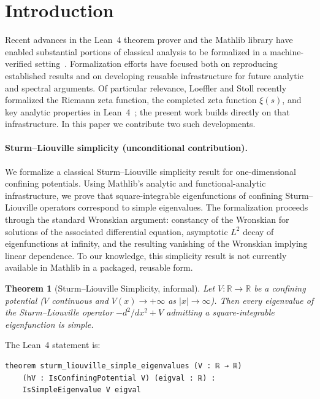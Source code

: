 \documentclass[12pt, a4paper]{article}
\theoremstyle{plain}
\newtheorem{theorem}{Theorem}[section]
\theoremstyle{definition}
\newcommand{\R}{\mathbb{R}}
\newcommand{\Mathlib}{\textsf{Mathlib}}
\newcommand{\Lean}{\textsf{Lean~4}}
\begin{document}
\tableofcontents
\bigskip

\section{Introduction}
\label{sec:intro}

Recent advances in the \Lean{} theorem prover and the \Mathlib{} library have
enabled substantial portions of classical analysis to be formalized in a
machine-verified setting~\cite{mathlib2020}.
Formalization efforts have focused both on reproducing established results and on
developing reusable infrastructure for future analytic and spectral arguments.
Of particular relevance, Loeffler and Stoll recently formalized the Riemann zeta
function, the completed zeta function $\xi(s)$, and key analytic properties in
\Lean{}~\cite{loeffler2025}; the present work builds directly on that infrastructure.
In this paper we contribute two such developments.

\paragraph{Sturm--Liouville simplicity (unconditional contribution).}
We formalize a classical Sturm--Liouville simplicity result for one-dimensional
confining potentials.
Using \Mathlib{}'s analytic and functional-analytic infrastructure, we prove that
square-integrable eigenfunctions of confining Sturm--Liouville operators correspond
to simple eigenvalues.
The formalization proceeds through the standard Wronskian argument: constancy of
the Wronskian for solutions of the associated differential equation, asymptotic
$L^2$ decay of eigenfunctions at infinity, and the resulting vanishing of the
Wronskian implying linear dependence.
To our knowledge, this simplicity result is not currently available in
\Mathlib{} in a packaged, reusable form.

\begin{theorem}[Sturm--Liouville Simplicity, informal]
\label{thm:sl_informal}
Let $V \colon \R \to \R$ be a confining potential
($V$ continuous and $V(x) \to +\infty$ as $|x| \to \infty$).
Then every eigenvalue of the Sturm--Liouville operator $-d^2/dx^2 + V$
admitting a square-integrable eigenfunction is simple.
\end{theorem}

The Lean~4 statement is:
\begin{lstlisting}[language=Lean4]
theorem sturm_liouville_simple_eigenvalues (V : ℝ → ℝ)
    (hV : IsConfiningPotential V) (eigval : ℝ) :
    IsSimpleEigenvalue V eigval
\end{lstlisting}
\end{document}

